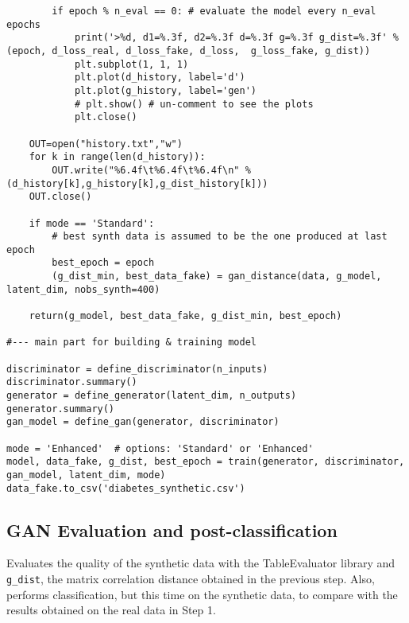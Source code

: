 \documentclass[oneside,10pt]{book}
\begin{document}
\begin{lstlisting}
        if epoch % n_eval == 0: # evaluate the model every n_eval epochs
            print('>%d, d1=%.3f, d2=%.3f d=%.3f g=%.3f g_dist=%.3f' % (epoch, d_loss_real, d_loss_fake, d_loss,  g_loss_fake, g_dist))
            plt.subplot(1, 1, 1)
            plt.plot(d_history, label='d')
            plt.plot(g_history, label='gen')
            # plt.show() # un-comment to see the plots
            plt.close()

    OUT=open("history.txt","w")
    for k in range(len(d_history)):
        OUT.write("%6.4f\t%6.4f\t%6.4f\n" %(d_history[k],g_history[k],g_dist_history[k]))
    OUT.close()

    if mode == 'Standard':
        # best synth data is assumed to be the one produced at last epoch
        best_epoch = epoch
        (g_dist_min, best_data_fake) = gan_distance(data, g_model, latent_dim, nobs_synth=400)

    return(g_model, best_data_fake, g_dist_min, best_epoch)

#--- main part for building & training model

discriminator = define_discriminator(n_inputs)
discriminator.summary()
generator = define_generator(latent_dim, n_outputs)
generator.summary()
gan_model = define_gan(generator, discriminator)

mode = 'Enhanced'  # options: 'Standard' or 'Enhanced'
model, data_fake, g_dist, best_epoch = train(generator, discriminator, gan_model, latent_dim, mode)
data_fake.to_csv('diabetes_synthetic.csv')
\end{lstlisting}

\subsection{GAN Evaluation and post-classification}\label{lasravc}

Evaluates the quality of the synthetic data with the TableEvaluator library
 and \texttt{g\_dist}, the matrix correlation distance obtained in the previous step. Also, performs classification, but this time
on the synthetic data, to compare with the results obtained on the real data in Step 1.\vspace{1ex}
\end{document}
